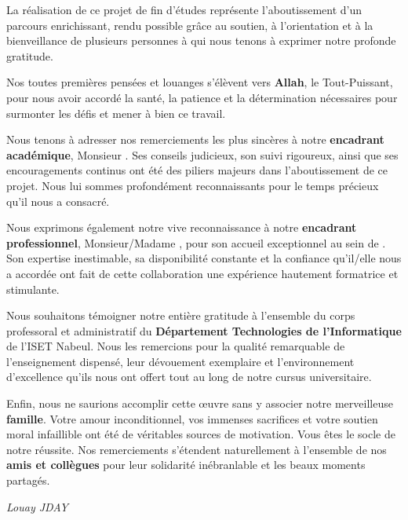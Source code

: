 
\begin{chapterintro}
  La réalisation de ce projet de fin d'études représente l'aboutissement d'un parcours enrichissant, rendu possible grâce au soutien, à l'orientation et à la bienveillance de plusieurs personnes à qui nous tenons à exprimer notre profonde gratitude.
\end{chapterintro}

\vspace{0.5cm}

Nos toutes premières pensées et louanges s'élèvent vers \textbf{Allah}, le Tout-Puissant, pour nous avoir accordé la santé, la patience et la détermination nécessaires pour surmonter les défis et mener à bien ce travail.

Nous tenons à adresser nos remerciements les plus sincères à notre \textbf{encadrant académique}, Monsieur \textbf{\encadreurAcad}. Ses conseils judicieux, son suivi rigoureux, ainsi que ses encouragements continus ont été des piliers majeurs dans l'aboutissement de ce projet. Nous lui sommes profondément reconnaissants pour le temps précieux qu'il nous a consacré.

Nous exprimons également notre vive reconnaissance à notre \textbf{encadrant professionnel}, Monsieur/Madame \textbf{\encadreurProf}, pour son accueil exceptionnel au sein de \textbf{\organisme}. Son expertise inestimable, sa disponibilité constante et la confiance qu'il/elle nous a accordée ont fait de cette collaboration une expérience hautement formatrice et stimulante.

Nous souhaitons témoigner notre entière gratitude à l'ensemble du corps professoral et administratif du \textbf{Département Technologies de l'Informatique} de l'ISET Nabeul. Nous les remercions pour la qualité remarquable de l'enseignement dispensé, leur dévouement exemplaire et l'environnement d'excellence qu'ils nous ont offert tout au long de notre cursus universitaire.

Enfin, nous ne saurions accomplir cette œuvre sans y associer notre merveilleuse \textbf{famille}. Votre amour inconditionnel, vos immenses sacrifices et votre soutien moral infaillible ont été de véritables sources de motivation. Vous êtes le socle de notre réussite. Nos remerciements s'étendent naturellement à l'ensemble de nos \textbf{amis et collègues} pour leur solidarité inébranlable et les beaux moments partagés.

\vspace{1cm}
\begin{flushright}
  \textit{Louay JDAY}
\end{flushright}
\cleardoublepage
